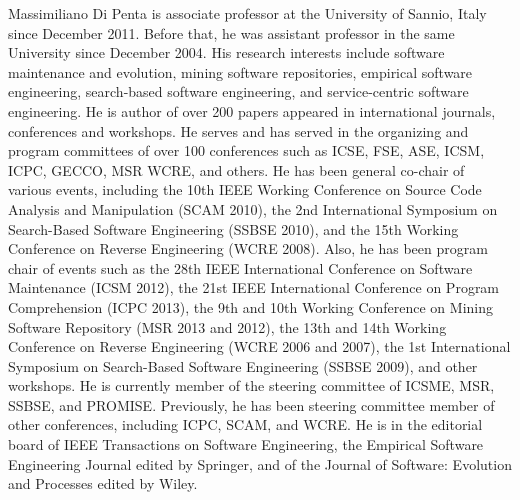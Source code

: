 Massimiliano Di Penta is associate professor at the University of Sannio, Italy since December 2011. Before that, he was assistant professor in the same University since December 2004. His research interests include software maintenance and evolution, mining software repositories, empirical software engineering, search-based software engineering, and service-centric software engineering. He is author of over 200 papers appeared in international journals, conferences and workshops. He serves and has served in the organizing and program committees of over 100 conferences such as ICSE, FSE, ASE, ICSM, ICPC, GECCO, MSR WCRE, and others. He has been general co-chair of various events, including the 10th IEEE Working Conference on Source Code Analysis and Manipulation (SCAM 2010), the 2nd International Symposium on Search-Based Software Engineering (SSBSE 2010), and the 15th Working Conference on Reverse Engineering (WCRE 2008). Also, he has been program chair of events such as the 28th IEEE International Conference on Software Maintenance (ICSM 2012), the 21st IEEE International Conference on Program Comprehension (ICPC 2013), the 9th and 10th Working Conference on Mining Software Repository (MSR 2013 and 2012), the 13th and 14th Working Conference on Reverse Engineering (WCRE 2006 and 2007), the 1st International Symposium on Search-Based Software Engineering (SSBSE 2009), and other workshops. He is currently member of the steering committee of ICSME, MSR, SSBSE, and PROMISE. Previously, he has been steering committee member of other conferences, including ICPC, SCAM, and WCRE. He is in the editorial board of IEEE Transactions on Software Engineering, the Empirical Software Engineering Journal edited by Springer, and of the Journal of Software: Evolution and Processes edited by Wiley.